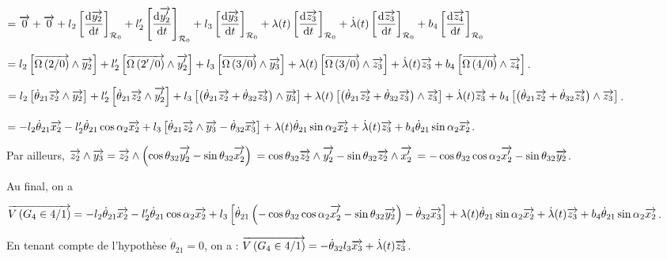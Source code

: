 \documentclass[10pt,fleqn]{article} %
\begin{document}
$= 
\overrightarrow{0}+
\overrightarrow{0}+
l_2\left[\dfrac{\text{d} \overrightarrow{y_2}}{\text{d} t}\right]_{\mathcal{R}_{0}}+
l_2'\left[\dfrac{\text{d} \overrightarrow{y_2'}}{\text{d} t}\right]_{\mathcal{R}_{0}}+
l_3\left[\dfrac{\text{d} \overrightarrow{y_3}}{\text{d} t}\right]_{\mathcal{R}_{0}}+
\lambda(t)\left[\dfrac{\text{d} \overrightarrow{z_3}}{\text{d} t}\right]_{\mathcal{R}_{0}}+
\dot{\lambda}(t)\left[\dfrac{\text{d} \overrightarrow{z_3}}{\text{d} t}\right]_{\mathcal{R}_{0}}+
b_4\left[\dfrac{\text{d} \overrightarrow{z_4}}{\text{d} t}\right]_{\mathcal{R}_{0}}$

$= 
l_2\left[ \overrightarrow{\Omega\left( {2}/{0}\right)} \wedge \overrightarrow{y_2} \right]+
l_2'\left[ \overrightarrow{\Omega\left( {2'}/{0}\right)} \wedge \overrightarrow{y_2'} \right]+
l_3\left[ \overrightarrow{\Omega\left( {3}/{0}\right)} \wedge \overrightarrow{y_3} \right]+
\lambda(t)\left[ \overrightarrow{\Omega\left( {3}/{0}\right)} \wedge \overrightarrow{z_3} \right]+
\dot{\lambda}(t)\overrightarrow{z_3}+
b_4\left[ \overrightarrow{\Omega\left( {4}/{0}\right)} \wedge \overrightarrow{z_4} \right]$. 

$= 
l_2\left[ \dot{\theta}_{21}\overrightarrow{z_2} \wedge \overrightarrow{y_2} \right]+
l_2'\left[ \dot{\theta}_{21}\overrightarrow{z_2} \wedge \overrightarrow{y_2'} \right]+
l_3\left[ \left(\dot{\theta}_{21}\overrightarrow{z_2}+\dot{\theta}_{32}\overrightarrow{z_3} \right) \wedge \overrightarrow{y_3} \right]+
\lambda(t)\left[ \left(\dot{\theta}_{21}\overrightarrow{z_2}+\dot{\theta}_{32}\overrightarrow{z_3} \right) \wedge \overrightarrow{z_3} \right]+
\dot{\lambda}(t)\overrightarrow{z_3}+
b_4\left[ \left(\dot{\theta}_{21}\overrightarrow{z_2}+\dot{\theta}_{32}\overrightarrow{z_3} \right) \wedge \overrightarrow{z_3} \right]$. 

$= 
-l_2 \dot{\theta}_{21}\overrightarrow{x_2} 
-l_2'\dot{\theta}_{21}\cos \alpha_2\overrightarrow{x_2}+
l_3\left[ \dot{\theta}_{21}\overrightarrow{z_2}\wedge \overrightarrow{y_3}-\dot{\theta}_{32}\overrightarrow{x_3}  \right]+
\lambda(t) \dot{\theta}_{21}\sin \alpha_2\overrightarrow{x_2} +
\dot{\lambda}(t)\overrightarrow{z_3}+ b_4\dot{\theta}_{21}\sin \alpha_2\overrightarrow{x_2}$. 


Par ailleurs, 
$\overrightarrow{z_2}\wedge \overrightarrow{y_3}=\overrightarrow{z_2}\wedge \left( \cos \theta_{32} \overrightarrow{y_2'} -\sin \theta_{32} \overrightarrow{x_2'}  \right)$
$= \cos \theta_{32} \overrightarrow{z_2}\wedge  \overrightarrow{y_2'} -\sin \theta_{32} \overrightarrow{z_2}\wedge\overrightarrow{x_2'}  $
$= -\cos \theta_{32} \cos \alpha_2 \overrightarrow{x_2'} -\sin \theta_{32} \overrightarrow{y_2}  $.

Au final, on a 

$\overrightarrow{V\left( {G_4} \in {4}/{1}\right)}=
-l_2 \dot{\theta}_{21}\overrightarrow{x_2} 
-l_2'\dot{\theta}_{21}\cos \alpha_2\overrightarrow{x_2}+
l_3\left[ \dot{\theta}_{21}\left(-\cos \theta_{32} \cos \alpha_2 \overrightarrow{x_2'} -\sin \theta_{32} \overrightarrow{y_2}  \right)-\dot{\theta}_{32}\overrightarrow{x_3}  \right]+
\lambda(t) \dot{\theta}_{21}\sin \alpha_2\overrightarrow{x_2} +
\dot{\lambda}(t)\overrightarrow{z_3}+ b_4\dot{\theta}_{21}\sin \alpha_2\overrightarrow{x_2}$.


En tenant compte de l'hypothèse $\dot{\theta}_{21}=0$, on a : $\overrightarrow{V\left( {G_4} \in {4}/{1}\right)}=
-\dot{\theta}_{32}l_3\overrightarrow{x_3}  + \dot{\lambda}(t)\overrightarrow{z_3}$.
\end{document}
